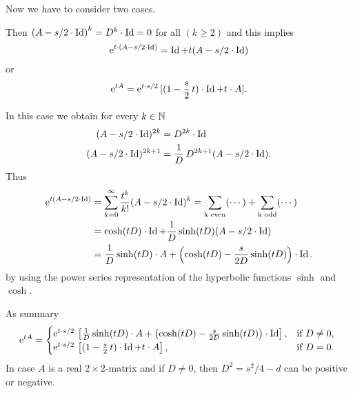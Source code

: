 Now we have to consider two cases.
\begin{description}[wide, labelindent=0em]

\item[$ D^{2} = 0 $: ] 
Then $\left( A - s/2 \cdot \operatorname{Id} \right)^{k} = D^{k} \cdot \operatorname{Id} = 0 $  for all $ (k \geq 2)$ and this implies 
%
\[
	  \mathrm{e}^{t \cdot \left( A - s/2 \cdot \operatorname{Id} \right)} = \operatorname{Id} + t( A - s/2 \cdot \operatorname{Id})
\]
%
or
%
\[
	 \mathrm{e}^{t A } =  \mathrm{e}^{t\cdot s/2} \, [ ( 1 - \frac{s}{2} \, t )\cdot \operatorname{Id} + t \cdot A] .
\]
%
\item[$ D^{2} \neq 0 $: ]
In this case we obtain for every $ k \in \mathbb{N} $
%
\begin{align*}
	( A - s/2 \cdot \operatorname{Id} )^{2k}  &= D^{2k} \cdot \operatorname{Id} \\ 
	( A - s/2 \cdot \operatorname{Id} )^{2k+1} &=\frac{1}{D} \, D^{2k+1}( A - s/2 \cdot \operatorname{Id}) .
\end{align*}
Thus 
\begin{align*}
	 \mathrm{e}^{t( A - s/2 \cdot \operatorname{Id} )} 
		& = \sum_{k=0}^\infty \frac{t^k}{k!}( A - s/2 \cdot \operatorname{Id} )^k 
		= \sum_{ \text{k even} } (\cdots) + \sum_{ \text{k odd} } (\cdots)  \\
	&= \cosh( t D ) \cdot \operatorname{Id} + \frac{1}{D} \sinh( t D )( A - s/2 \cdot \operatorname{Id}) \\
	&= \frac{ 1 }{ D } \sinh( tD )\cdot A + \left( \cosh(tD) - \frac{s}{2D} \sinh(tD) \right) \cdot \operatorname{Id}.
\end{align*}
by using the power series representation of the hyperbolic functions $ \sinh $ and $ \cosh $.
\end{description}
As summary  
\begin{equation*}\label{eq:exp-rep}
	 \mathrm{e}^{tA} =
	\begin{cases}
		 \mathrm{e}^{t \cdot s/2} \, \left[ \frac{1}{D} \sinh(t D)  \cdot A + 
			\left( \cosh(tD) - \frac{s}{2D} \sinh(tD) \right) \cdot \operatorname{Id} \right], & 
									\text{if $ D \neq 0 $, } \\
		 \mathrm{e}^{t \cdot s/2} \, \left[ ( 1 - \frac{s}{2} \, t )\cdot \operatorname{Id} + t \cdot A \right], &
									\text{if $ D = 0 $.}
	\end{cases}
\end{equation*}
In case $A$ is a real $2 \times2$-matrix and if $ D \neq 0 $, then 
$ D^{2} = s^{2}/4 - d $ can be positive or negative. 
